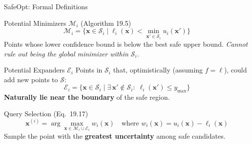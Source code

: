 \documentclass[aspectratio=169,10pt]{beamer}
\begin{document}
\begin{frame}{SafeOpt: Formal Definitions}
  \begin{block}{Potential Minimizers $\mathcal{M}_i$ (Algorithm 19.5)}
    \[
      \mathcal{M}_i = \bigl\{\mathbf{x} \in \mathcal{S}_i \mid
        \ell_i(\mathbf{x}) < \min_{\mathbf{x}' \in \mathcal{S}_i} u_i(\mathbf{x}')\bigr\}
      \tag{19.13 -- 19.14}
    \]
    Points whose lower confidence bound is below the best safe upper bound.
    \emph{Cannot rule out being the global minimizer within $\mathcal{S}_i$.}
  \end{block}
  \begin{block}{Potential Expanders $\mathcal{E}_i$}
    Points in $\mathcal{S}_i$ that, optimistically (assuming $f =\ell$),
    could add new points to $\mathcal{S}$:
    \[
      \mathcal{E}_i = \bigl\{\mathbf{x}\in\mathcal{S}_i \mid
        \exists\,\mathbf{x}'\notin\mathcal{S}_i:\;
        \ell_i(\mathbf{x}') \leq y_{\max}\bigr\}
      \tag{19.15 -- 19.16}
    \]
    \textbf{Naturally lie near the boundary} of the safe region.
  \end{block}
  \begin{block}{Query Selection (Eq.~19.17)}
    \[
      \mathbf{x}^{(i)} = \arg\max_{\mathbf{x} \in \mathcal{M}_i \cup \mathcal{E}_i}
        w_i(\mathbf{x}) \quad \text{where } w_i(\mathbf{x}) = u_i(\mathbf{x}) - \ell_i(\mathbf{x})
      \tag{19.17}
    \]
    Sample the point with the \textbf{greatest uncertainty} among safe candidates.
  \end{block}
\end{frame}
\end{document}
